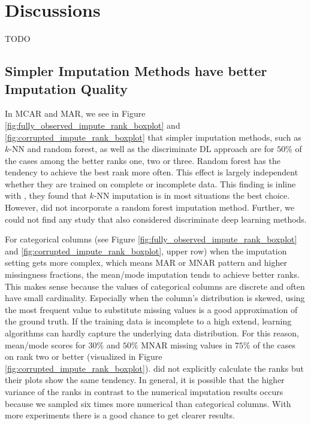 

\section{Discussions}

TODO

\subsection{Simpler Imputation Methods have better Imputation Quality}
%
In MCAR and MAR, we see in Figure \ref{fig:fully_observed_impute_rank_boxplot} and \ref{fig:corrupted_impute_rank_boxplot} that simpler imputation methods, such as $k$-NN and random forest, as well as the discriminate DL approach are for $50\%$ of the cases among the better ranks one, two or three. Random forest has the tendency to achieve the best rank more often. This effect is largely independent whether they are trained on complete or incomplete data.
This finding is inline with \cite{Imputation_Benchmark_3, Imputation_Benchmark_2, Imputation_Benchmark_4}, they found that $k$-NN imputation is in most situations the best choice. However, \cite{Imputation_Benchmark_2, Imputation_Benchmark_4} did not incorporate a random forest imputation method. Further, we could not find any study that also considered discriminate deep learning methods.

For categorical columns (see Figure \ref{fig:fully_observed_impute_rank_boxplot} and \ref{fig:corrupted_impute_rank_boxplot}, upper row) when the imputation setting gets more complex, which means MAR or MNAR pattern and higher missingness fractions, the mean/mode imputation tends to achieve better ranks. This makes sense because the values of categorical columns are discrete and often have small cardinality. Especially when the column's distribution is skewed, using the most frequent value to substitute missing values is a good approximation of the ground truth. If the training data is incomplete to a high extend, learning algorithms can hardly capture the underlying data distribution. For this reason, mean/mode scores for $30\%$ and $50\%$ MNAR missing values in $75\%$ of the cases on rank two or better (visualized in Figure \ref{fig:corrupted_impute_rank_boxplot}). \cite{Imputation_Benchmark_3} did not explicitly calculate the ranks but their plots show the same tendency. In general, it is possible that the higher variance of the ranks in contrast to the numerical imputation results occurs because we sampled six times more numerical than categorical columns. With more experiments there is a good chance to get clearer results.

